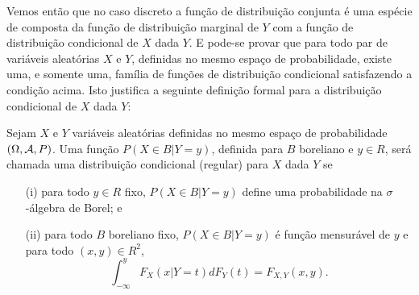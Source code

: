 \begin{frame}
\begin{block}{}
Vemos então que no caso discreto a função de distribuição conjunta é
uma espécie de composta da função de distribuição marginal de $Y$
com a função de distribuição condicional de $X$ dada $Y$. E pode-se
provar que para todo par de variáveis aleatórias $X$ e $Y$,
definidas no mesmo espaço de probabilidade, existe uma, e somente
uma, família de funções de distribuição condicional satisfazendo a
condição acima. Isto justifica a seguinte definição formal para a distribuição condicional
de $X$ dada $Y$:
\end{block}
\begin{defi}
	\label{def_form1} Sejam $X$ e $Y$ variáveis aleatórias definidas no
	mesmo espaço de probabilidade $(\Omega, {\cal A}, P)$. Uma função $P(X\in
	B|Y=y)$, definida para $B$ boreliano e $y\in R$, será chamada uma
	distribuição condicional (regular) para $X$ dada $Y$ se
	\begin{enumerate}
		\item[(i)] para todo $y\in R$ fixo, $P(X\in B|Y=y)$ define uma
		probabilidade na $\sigma$-álgebra de Borel; e
		
		\item[(ii)] para todo $B$ boreliano fixo, $P(X\in B|Y=y)$ é função
		mensurável de $y$ e para todo $(x,y)\in R^2$,
		$$\int_{-\infty}^{y}F_X(x|Y=t)dF_Y(t)=F_{X,Y}(x,y).$$
	\end{enumerate}
\end{defi}
\end{frame}

